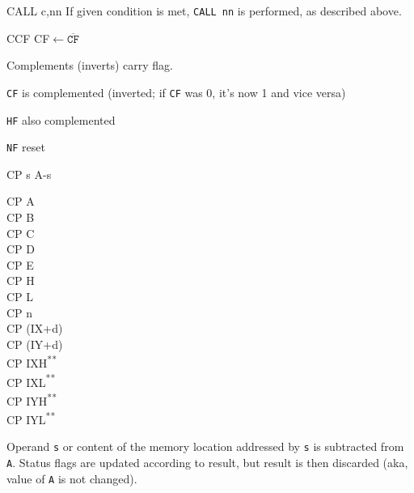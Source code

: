 \documentclass[twoside,openright,a4paper]{book}
\newcommand{\UNDOC}{\textnormal{\textsuperscript{**}}}
\begin{document}
\begin{basedescript}{
	\desclabelstyle{\multilinelabel}
	\desclabelwidth{3cm}}
\begin{detailitem}{CALL c,nn}
		If given condition is met, {\tt CALL nn} is performed, as described above.

		\DetailNoEffect
				
		\begin{DetailTiming}
		\end{DetailTiming}

	\end{detailitem}

	\begin{detailitem}{CCF}
		{CF$\leftarrow\mathtt{\overline{CF}}$}

		Complements (inverts) carry flag.

		\begin{DetailEffects}
			\item {\tt CF} is complemented (inverted; if {\tt CF} was 0, it's now 1 and vice versa)
			\item {\tt HF} also complemented
			\item {\tt NF} reset
		\end{DetailEffects}
		
		\begin{DetailTiming}
			\DetailTime{}{1}{4}
		\end{DetailTiming}

	\end{detailitem}
	
	\pagebreak
	\begin{detailitem}{CP s}
		{A-s}

		\begin{DetailVariants}
			CP A\\
			CP B\\
			CP C\\
			CP D\\
			CP E\\
			CP H\\
			CP L\\
			CP n\\
			CP (IX+d)\\
			CP (IY+d)\\
			CP IXH\UNDOC\\
			CP IXL\UNDOC\\
			CP IYH\UNDOC\\
			CP IYL\UNDOC\\
		\end{DetailVariants}

		Operand {\tt s} or content of the memory location addressed by {\tt s} is subtracted from {\tt A}. Status flags are updated according to result, but result is then discarded (aka, value of {\tt A} is not changed).


\end{detailitem}
\end{basedescript}
\end{document}
